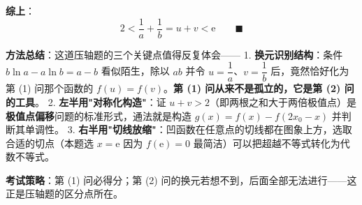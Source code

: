 \textbf{综上}：
\[2<\frac1a+\frac1b=u+v<\mathrm e\qquad\blacksquare\]

\begin{gktip}
\textbf{方法总结}：这道压轴题的三个关键点值得反复体会——
1. \textbf{换元识别结构}：条件 $b\ln a-a\ln b=a-b$ 看似陌生，除以 $ab$ 并令 $u=\dfrac1a$、$v=\dfrac1b$ 后，竟然恰好化为第 (1) 问那个函数的 $f(u)=f(v)$。\textbf{第 (1) 问从来不是孤立的，它是第 (2) 问的工具}。
2. \textbf{左半用"对称化构造"}：证 $u+v>2$（即两根之和大于两倍极值点）是\textbf{极值点偏移}问题的标准形式，通法就是构造 $g(x)=f(x)-f(2x_0-x)$ 并判断其单调性。
3. \textbf{右半用"切线放缩"}：凹函数在任意点的切线都在图象上方，选取合适的切点（本题选 $x=\mathrm e$ 因为 $f(\mathrm e)=0$ 最简洁）可以把超越不等式转化为代数不等式。

\textbf{考试策略}：第 (1) 问必得分；第 (2) 问的换元若想不到，后面全部无法进行——这正是压轴题的区分点所在。
\end{gktip}

